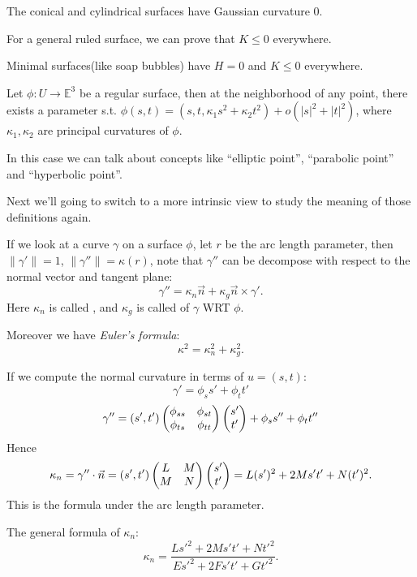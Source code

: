 \begin{example}
	The conical and cylindrical surfaces have Gaussian curvature $0$.

	For a general ruled surface, we can prove that $K\le 0$ everywhere.
\end{example}
\begin{example}
    Minimal surfaces(like soap bubbles) have $H=0$ and $K\le 0$ everywhere.
\end{example}
\begin{example}
	Let $\phi:U\to \mathbb{E}^3$ be a regular surface,
	then at the neighborhood of any point, there exists a
	parameter s.t. $\phi(s,t) = (s, t, \kappa_1s^2+\kappa_2t^2) + o(|s|^2+|t|^2)$,
	where $\kappa_1,\kappa_2$ are principal curvatures of $\phi$.

	In this case we can talk about concepts like ``elliptic point'',
	``parabolic point'' and ``hyperbolic point''.
\end{example}

Next we'll going to switch to a more intrinsic view to study the meaning
of those definitions again.

If we look at a curve $\gamma$ on a surface $\phi$,
let $r$ be the arc length parameter, then $\lVert \gamma' \rVert = 1$,
$\lVert \gamma'' \rVert = \kappa(r)$, note that $\gamma''$ can be decompose
with respect to the normal vector and tangent plane:
\[
	\gamma''=\kappa_n \vec{n}+\kappa_g\vec{n}\times \gamma'.
\]
Here $\kappa_n$ is called ,
and $\kappa_g$ is called  of $\gamma$ WRT $\phi$.

Moreover we have \textit{Euler's formula}:
\[
\kappa^2 = \kappa_n^2 + \kappa_g^2.
\]

If we compute the normal curvature in terms of $u=(s,t)$:
 \[
\gamma' = \phi_s s' + \phi_t t'
\]
\[
\gamma'' = (s',t')\begin{pmatrix}
	\phi_{ss} &\phi_{st}\\\phi_{ts}&\phi_{tt}
\end{pmatrix}
\begin{pmatrix} s'\\t' \end{pmatrix} + \phi_s s'' + \phi_t t''
\]
Hence
\[
\kappa_n = \gamma''\cdot \vec{n}
= (s', t')\begin{pmatrix} L&M\\M&N \end{pmatrix} \begin{pmatrix} s'\\t' \end{pmatrix} = L(s')^2+2Ms't'+N(t')^2.
\]
This is the formula under the arc length parameter.
\begin{remark}
    The general formula of $\kappa_n$:
	\[
	\kappa_n = \frac{Ls'^2 + 2Ms't' + Nt'^2}{Es'^2 + 2Fs't' + Gt'^2}.
	\]
\end{remark}

